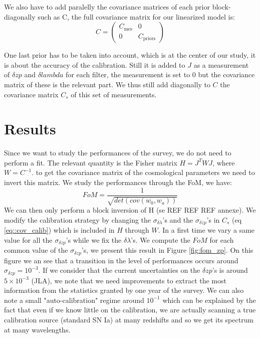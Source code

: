 \documentclass[\docopts]{\docclass}
\begin{document}
We also have to add paralelly the covariance matrices of each prior block-diagonally such as C, the full covariance matrix for our linearized model is:
\begin{equation}
C =
\begin{pmatrix}
  C_\text{mes} & 0 \\
  0 & C_\text{priors}
\end{pmatrix}  
\end{equation}

One last prior has to be taken into account, which is at the center of our study, it is about the accuracy of the calibration.
Still it is added to $J$ as a measurement of $\delta zp$ and $\delta lambda$ for each filter, the measurement is set to 0 but the covariance matrix of these is the relevant part.
We thus still add diagonally to $C$ the covariance matrix $C_s$ of this set of measurements.


\section{Results}
\label{sec::results}
Since we want to study the performances of the survey, we do not need to perform a fit.
The relevant quantity is the Fisher matrix $H = J^TWJ$, where $W = C^{-1}$.
to get the covariance matrix of the cosmological parameters we need to invert this matrix.
We study the performances through the FoM, we have:
\begin{equation}
FoM = \frac{1}{\sqrt{det(cov(w_0, w_a))}}
\end{equation}
We can then only perform a block inversion of H (se REF REF REF annexe).
We modify the calibration strategy by changing the $\sigma_{\delta \lambda}$'s and the $\sigma_{\delta zp}$'s in $C_s$ (eq \ref{eq::cov_calib}) which is included in $H$ through $W$.
In a first time we vary a same value for all the $\sigma_{\delta zp}$'s while we fix the $\delta \lambda$'s.
We compute the $FoM$ for each common value of the $\sigma_{\delta zp}$'s, we present this result in Figure \ref{fig:fom_zp}.
On this figure we an see that a transition in the level of performances occurs around $\sigma_{\delta zp} = 10^{-3}$.
If we consider that the current uncertainties on the $\delta zp$'s is around $5 \times 10^{-3}$ (JLA), we note that we need improvements to extract the most information from the statistics granted by one year of the survey.
We can also note a small "auto-calibration" regime around $10^{-1}$ which can be explained by the fact that even if we know little on the calibration, we are actually scanning a true calibration source (standard SN Ia) at many redshifts and so we get its spectrum at many wavelengths.
\end{document}
